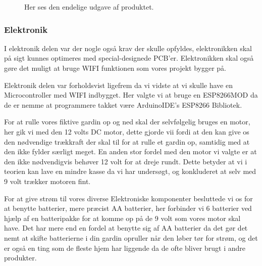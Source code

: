 \documentclass[11pt]{article}
\begin{document}
\begin{figure}[htbp]
    \centering
    \caption{Her ses den endelige udgave af produktet. }
    \end{figure}
    

\subsubsection{Elektronik}
I elektronik delen var der nogle også krav der skulle opfyldes, elektronikken skal på sigt kunnes optimeres med special-designede PCB'er. Elektronikken skal også gøre det muligt at bruge WIFI funktionen som vores projekt bygger på.

Elektronik delen var forholdsvist ligefrem da vi vidste at vi skulle have en Microcontroller med WIFI indbygget. Her valgte vi at bruge en ESP8266MOD da de er nemme at programmere takket være ArduinoIDE's ESP8266 Bibliotek.

For at rulle vores fiktive gardin op og ned skal der selvfølgelig bruges en motor, her gik vi med den 12 volts DC motor, dette gjorde vii fordi at den kan give os den nødvendige trækkraft der skal til for at rulle et gardin op, samtidig med at den ikke fylder særligt meget. En anden stor fordel med den motor vi valgte er at den ikke nødvendigvis behøver 12 volt for at dreje rundt. Dette betyder at vi i teorien kan lave en mindre kasse da vi har undersøgt, og konkluderet at selv med 9 volt trækker motoren fint. 

For at give strøm til vores diverse Elektroniske komponenter besluttede vi os for at benytte batterier, mere præcist AA batterier, her forbinder vi 6 batterier ved hjælp af en batteripakke for at komme op på de 9 volt som vores motor skal have. Det har mere end en fordel at benytte sig af AA batterier da det gør det nemt at skifte batterierne i din gardin opruller når den løber tør for strøm, og det er også en ting som de fleste hjem har liggende da de ofte bliver brugt i andre produkter.
\end{document}
